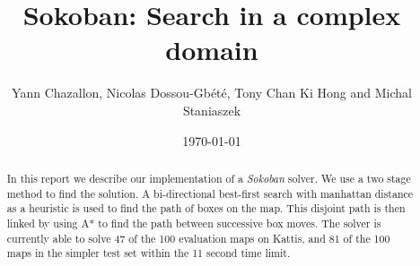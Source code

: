 \documentclass[a4paper,11pt]{article}
\title{Sokoban: Search in a complex domain}
\author{Yann Chazallon,  Nicolas Dossou-Gb{\'e}t{\'e}, Tony Chan Ki Hong and Michal Staniaszek}
\date{\today}
\begin{document}
\maketitle

\begin{abstract}
  In this report we describe our implementation of a \emph{Sokoban} solver. We
  use a two stage method to find the solution. A bi-directional best-first
  search with manhattan distance as a heuristic is used to find the path of
  boxes on the map. This disjoint path is then linked by using A* to find the
  path between successive box moves. The solver is currently able to solve 47 of
  the 100 evaluation maps on Kattis, and 81 of the 100 maps in the simpler test
  set within the 11 second time limit.
\end{abstract}

\begin{figure}[!ht]
  \captionsetup[subfigure]{labelformat=empty}
  \centering
  \quad
  \quad
  \quad
\end{figure}
\end{document}
